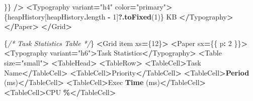 \documentclass[
]{article}
\newenvironment{Shaded}{\begin{snugshade}}{\end{snugshade}}
\newcommand{\AttributeTok}[1]{\textcolor[rgb]{0.13,0.29,0.53}{#1}}
\newcommand{\CommentTok}[1]{\textcolor[rgb]{0.56,0.35,0.01}{\textit{#1}}}
\newcommand{\DecValTok}[1]{\textcolor[rgb]{0.00,0.00,0.81}{#1}}
\newcommand{\FunctionTok}[1]{\textcolor[rgb]{0.13,0.29,0.53}{\textbf{#1}}}
\newcommand{\NormalTok}[1]{#1}
\newcommand{\OperatorTok}[1]{\textcolor[rgb]{0.81,0.36,0.00}{\textbf{#1}}}
\newcommand{\StringTok}[1]{\textcolor[rgb]{0.31,0.60,0.02}{#1}}
\begin{document}
\begin{Shaded}
\begin{Highlighting}[]
\NormalTok{            \}\}}
          \OperatorTok{/\textgreater{}}
          \OperatorTok{\textless{}}\NormalTok{Typography variant}\OperatorTok{=}\StringTok{"h4"}\NormalTok{ color}\OperatorTok{=}\StringTok{"primary"}\OperatorTok{\textgreater{}}
\NormalTok{            \{heapHistory[heapHistory}\OperatorTok{.}\AttributeTok{length} \OperatorTok{{-}} \DecValTok{1}\NormalTok{]}\OperatorTok{?.}\FunctionTok{toFixed}\NormalTok{(}\DecValTok{1}\NormalTok{)\} KB}
          \OperatorTok{\textless{}/}\NormalTok{Typography}\OperatorTok{\textgreater{}}
        \OperatorTok{\textless{}/}\NormalTok{Paper}\OperatorTok{\textgreater{}}
      \OperatorTok{\textless{}/}\NormalTok{Grid}\OperatorTok{\textgreater{}}

\NormalTok{      \{}\CommentTok{/* Task Statistics Table */}\NormalTok{\}}
      \OperatorTok{\textless{}}\NormalTok{Grid item xs}\OperatorTok{=}\NormalTok{\{}\DecValTok{12}\NormalTok{\}}\OperatorTok{\textgreater{}}
        \OperatorTok{\textless{}}\NormalTok{Paper sx}\OperatorTok{=}\NormalTok{\{\{ p}\OperatorTok{:} \DecValTok{2}\NormalTok{ \}\}}\OperatorTok{\textgreater{}}
          \OperatorTok{\textless{}}\NormalTok{Typography variant}\OperatorTok{=}\StringTok{"h6"}\OperatorTok{\textgreater{}}\NormalTok{Task Statistics}\OperatorTok{\textless{}/}\NormalTok{Typography}\OperatorTok{\textgreater{}}
          \OperatorTok{\textless{}}\NormalTok{Table size}\OperatorTok{=}\StringTok{"small"}\OperatorTok{\textgreater{}}
            \OperatorTok{\textless{}}\NormalTok{TableHead}\OperatorTok{\textgreater{}}
              \OperatorTok{\textless{}}\NormalTok{TableRow}\OperatorTok{\textgreater{}}
                \OperatorTok{\textless{}}\NormalTok{TableCell}\OperatorTok{\textgreater{}}\NormalTok{Task Name}\OperatorTok{\textless{}/}\NormalTok{TableCell}\OperatorTok{\textgreater{}}
                \OperatorTok{\textless{}}\NormalTok{TableCell}\OperatorTok{\textgreater{}}\NormalTok{Priority}\OperatorTok{\textless{}/}\NormalTok{TableCell}\OperatorTok{\textgreater{}}
                \OperatorTok{\textless{}}\NormalTok{TableCell}\OperatorTok{\textgreater{}}\FunctionTok{Period}\NormalTok{ (ms)}\OperatorTok{\textless{}/}\NormalTok{TableCell}\OperatorTok{\textgreater{}}
                \OperatorTok{\textless{}}\NormalTok{TableCell}\OperatorTok{\textgreater{}}\NormalTok{Exec }\FunctionTok{Time}\NormalTok{ (ms)}\OperatorTok{\textless{}/}\NormalTok{TableCell}\OperatorTok{\textgreater{}}
                \OperatorTok{\textless{}}\NormalTok{TableCell}\OperatorTok{\textgreater{}}\NormalTok{CPU }\OperatorTok{\%\textless{}/}\NormalTok{TableCell}\OperatorTok{\textgreater{}}

\end{Highlighting}
\end{Shaded}
\end{document}
